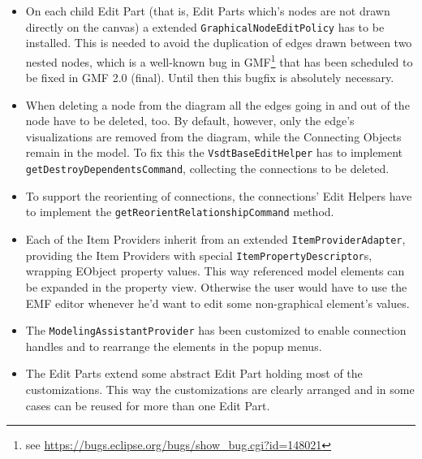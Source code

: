 \begin{itemize}

	\item On each child Edit Part (that is, Edit Parts which's nodes are not drawn directly on the canvas) a extended \verb|GraphicalNodeEditPolicy| has to be installed. This is needed to avoid the duplication of edges drawn between two nested nodes, which is a well-known bug in GMF\footnote{see \url{https://bugs.eclipse.org/bugs/show_bug.cgi?id=148021}} that has been scheduled to be fixed in GMF 2.0 (final). Until then this bugfix is absolutely necessary.
	
	\item When deleting a node from the diagram all the edges going in and out of the node have to be deleted, too. By default, however, only the edge's visualizations are removed from the diagram, while the Connecting Objects remain in the model. To fix this the \verb|VsdtBaseEditHelper| has to implement \verb|getDestroyDependentsCommand|, collecting the connections to be deleted. %
	
	\item To support the reorienting of connections, the connections' Edit Helpers have to implement the \verb|getReorientRelationshipCommand| method.
	
	\item Each of the Item Providers inherit from an extended \verb|ItemProviderAdapter|, providing the Item Providers with special \verb|ItemPropertyDescriptor|s, wrapping EObject property values. This way referenced model elements can be expanded in the property view. Otherwise the user would have to use the EMF editor whenever he'd want to edit some non-graphical element's values.
	
	\item The \verb|ModelingAssistantProvider| has been customized to enable connection handles and to rearrange the elements in the popup menus.
	
	\item The Edit Parts extend some abstract Edit Part holding most of the customizations. This way the customizations are clearly arranged and in some cases can be reused for more than one Edit Part. %
	

\end{itemize}
